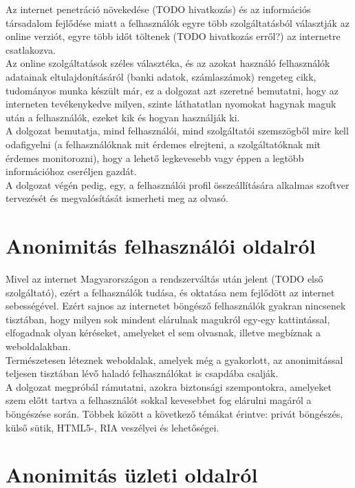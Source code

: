 
Az internet penetráció növekedése (TODO hivatkozás) és az információs társadalom fejlődése miatt a felhasználók egyre több szolgáltatásból választják az online verziót, egyre több időt töltenek (TODO hivatkozás erről?) az internetre csatlakozva.\\
Az online szolgáltatások széles választéka, és az azokat használó felhasználók adatainak eltulajdonításáról (banki adatok, számlaszámok) rengeteg cikk, tudományos munka készült már, ez a dolgozat azt szeretné bemutatni, hogy az interneten tevékenykedve milyen, szinte láthatatlan nyomokat hagynak maguk után a felhasználók, ezeket kik és hogyan használják ki.\\
A dolgozat bemutatja, mind felhasználói, mind szolgáltatói szemszögből mire kell odafigyelni (a felhasználóknak mit érdemes elrejteni, a szolgáltatóknak mit érdemes monitorozni), hogy a lehető legkevesebb vagy éppen a legtöbb információhoz cseréljen gazdát.
\\
A dolgozat végén pedig, egy, a felhasználói profil összeállítására alkalmas szoftver tervezését és megvalósítását ismerheti meg az olvasó.
\clearpage

\section{Anonimitás felhasználói oldalról} %
\label{sec:anonimitás_felhasználói_oldalról}

Mivel az internet Magyarországon a rendszerváltás után jelent (TODO első szolgáltató), ezért a felhasználók tudása, és oktatása nem fejlődött az internet sebességével. Ezért sajnos az internetet böngésző felhasználók gyakran nincsenek tisztában, hogy milyen sok mindent elárulnak magukról egy-egy kattintással, elfogadnak olyan kéréseket, amelyeket el sem olvasnak, illetve megbíznak a weboldalakban.\\
Természetesen léteznek weboldalak, amelyek még a gyakorlott, az anonimitással teljesen tisztában lévő haladó felhasználókat is csapdába csalják.\\
A dolgozat megpróbál rámutatni, azokra biztonsági szempontokra, amelyeket szem előtt tartva a felhasználót sokkal kevesebbet fog elárulni magáról a böngészése során. Többek között a következő témákat érintve: privát böngészés, külső sütik, HTML5-, RIA veszélyei és lehetőségei.

\section{Anonimitás üzleti oldalról} %
\label{sec:anonimitás_üzleti_oldalról}

